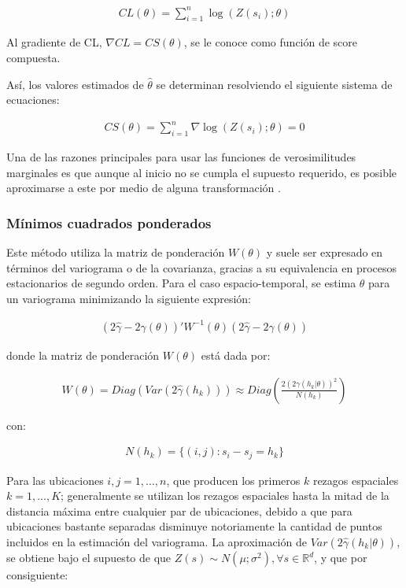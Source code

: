 \documentclass[
]{book}
\begin{document}
\begin{align*}
   CL(\theta)=\sum_{i=1}^{n} \log(Z(s_i);\theta)  
\end{align*}

Al gradiente de CL, \(\nabla CL=CS(\theta)\), se le conoce como función de score compuesta.

Así, los valores estimados de \(\hat{\theta}\) se determinan resolviendo el siguiente sistema de ecuaciones:

\begin{align*}
   CS(\theta)=\sum_{i=1}^{n} \nabla\log(Z(s_i);\theta)=0  
\end{align*}

Una de las razones principales para usar las funciones de verosimilitudes marginales es que aunque al inicio no se cumpla el supuesto requerido, es posible aproximarse a este por medio de alguna transformación \citep{marta}.

\hypertarget{muxednimos-cuadrados-ponderados}{%
\subsubsection*{Mínimos cuadrados ponderados}\label{muxednimos-cuadrados-ponderados}}

Este método utiliza la matriz de ponderación \(W(\theta)\) y suele ser expresado en términos del variograma o de la covarianza, gracias a su equivalencia en procesos estacionarios de segundo orden. Para el caso espacio-temporal, se estima \(\theta\) para un variograma minimizando la siguiente expresión:

\begin{align*}
  (2\hat{\gamma}-2\gamma(\theta))'W^{-1}(\theta)(2\hat{\gamma}-2\gamma(\theta))  
\end{align*}

donde la matriz de ponderación \(W(\theta)\) está dada por:

\begin{align*}
  W(\theta)=Diag(Var(2\hat{\gamma}(h_k)))\approx Diag\left(\frac{2(2\gamma(h_k|\theta))^2}{N(h_k)}\right)  
\end{align*}

con:

\begin{align*}
  N(h_k)=\{(i,j):s_i-s_j=h_k\}  
\end{align*}

Para las ubicaciones \(i,j=1,...,n\), que producen los primeros \(k\) rezagos espaciales \(k=1,...,K\); generalmente se utilizan los rezagos espaciales hasta la mitad de la distancia máxima entre cualquier par de ubicaciones, debido a que para ubicaciones bastante separadas disminuye notoriamente la cantidad de puntos incluidos en la estimación del variograma. La aproximación de \(Var(2\hat{\gamma}(h_k|\theta))\), se obtiene bajo el supuesto de que \(Z(s)\sim N(\mu;\sigma^2), \forall s\in \mathbb{R}^d\), y que por consiguiente:
\end{document}
